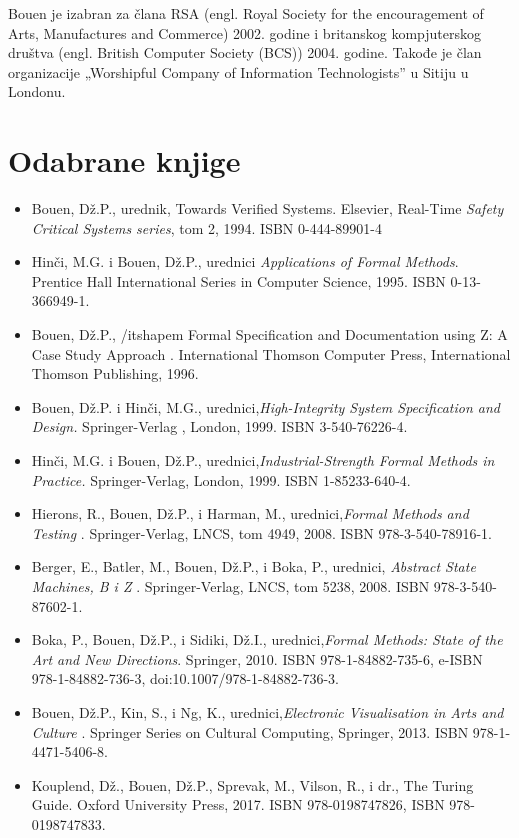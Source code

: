 \documentclass[a4paper]{article}
\begin{document}
Bouen je izabran za člana RSA (engl. Royal Society for the encouragement of Arts, Manufactures and Commerce) 2002. godine i britanskog kompjuterskog društva (engl. British Computer Society (BCS)) 2004. godine. Takođe je član organizacije „Worshipful Company of Information Technologists” u Sitiju u Londonu.

\section{Odabrane knjige}
 


\begin{itemize}
\item Bouen, Dž.P., urednik, Towards Verified Systems. Elsevier, Real-Time {\itshape Safety Critical Systems series}, tom 2, 1994. ISBN 0-444-89901-4
\item Hinči, M.G. i Bouen, Dž.P., urednici {\itshape Applications of Formal Methods}. Prentice Hall International Series in Computer Science, 1995. ISBN 0-13-366949-1.
\item Bouen, Dž.P., {/itshapem Formal Specification and Documentation using Z: A Case Study Approach }. International Thomson Computer Press, International Thomson Publishing, 1996. 
\item Bouen, Dž.P. i Hinči, M.G., urednici,{\itshape High-Integrity System Specification and Design. }Springer-Verlag , London, 1999. ISBN 3-540-76226-4.
\item Hinči, M.G. i Bouen, Dž.P., urednici,{\itshape Industrial-Strength Formal Methods in Practice. } Springer-Verlag, London, 1999. ISBN 1-85233-640-4.
\item Hierons, R., Bouen, Dž.P., i Harman, M., urednici,{\itshape  Formal Methods and Testing} . Springer-Verlag, LNCS, tom 4949, 2008. ISBN 978-3-540-78916-1.
\item Berger, E., Batler, M., Bouen, Dž.P., i Boka, P., urednici, {\itshape Abstract State Machines, B i Z }. Springer-Verlag, LNCS, tom 5238, 2008. ISBN 978-3-540-87602-1.
\item Boka, P., Bouen, Dž.P., i Sidiki, Dž.I., urednici,{\itshape Formal Methods: State of the Art and New Directions}. Springer, 2010. ISBN 978-1-84882-735-6, e-ISBN 978-1-84882-736-3, doi:10.1007/978-1-84882-736-3.
\item Bouen, Dž.P., Kin, S., i Ng, K., urednici,{\itshape Electronic Visualisation in Arts and Culture} . Springer Series on Cultural Computing, Springer, 2013. ISBN 978-1-4471-5406-8.
\item Kouplend, Dž., Bouen, Dž.P., Sprevak, M., Vilson, R., i dr., The Turing Guide. Oxford University Press, 2017. ISBN 978-0198747826, ISBN 978-0198747833.

\end{itemize}
\end{document}
